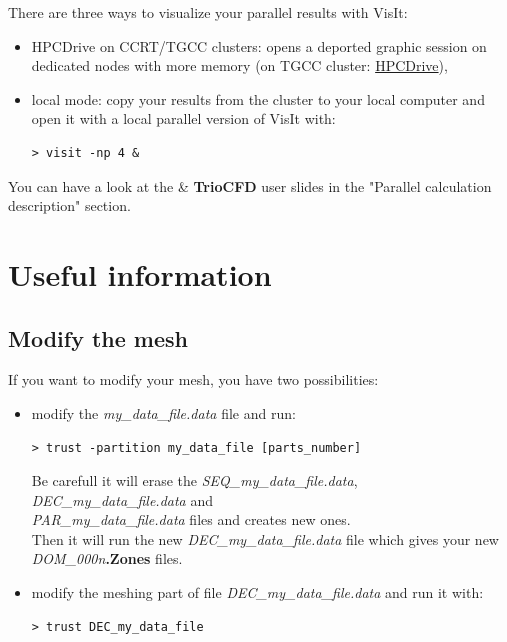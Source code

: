 There are three ways to visualize your parallel results with VisIt:
\begin{itemize}
\item HPCDrive on CCRT/TGCC clusters: opens a deported graphic session on dedicated nodes with more memory (on TGCC cluster: \href{https://visu-tgcc.ccc.cea.fr/HPCDrive/home}{HPCDrive}),
\item local mode: copy your results from the cluster to your local computer and open it with a local parallel version of VisIt with:
\begin{verbatim}
> visit -np 4 &
\end{verbatim}
\end{itemize}

You can have a look at the \trust \& \textbf{TrioCFD} user slides in the "Parallel calculation description" section.




\section{Useful information}
\subsection{Modify the mesh}
If you want to modify your mesh, you have two possibilities:
\begin{itemize} 
\item modify the \textit{my\_data\_file.data} file and run:
\begin{verbatim}
> trust -partition my_data_file [parts_number]
\end{verbatim}
Be carefull it will erase the \textit{SEQ\_my\_data\_file.data}, \textit{DEC\_my\_data\_file.data} and \\
\textit{PAR\_my\_data\_file.data} files and creates new ones.\\
Then it will run the new \textit{DEC\_my\_data\_file.data} file which gives your new \textit{DOM\_000n}\textbf{.Zones} files.

\item modify the meshing part of file \textit{DEC\_my\_data\_file.data} and run it with:
\begin{verbatim}
> trust DEC_my_data_file
\end{verbatim}
\end{itemize}

